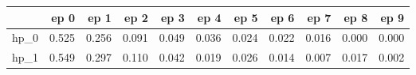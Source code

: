 \begin{tabular}{lrrrrrrrrrr}
\toprule
{} &   ep 0 &   ep 1 &   ep 2 &   ep 3 &   ep 4 &   ep 5 &   ep 6 &   ep 7 &   ep 8 &   ep 9 \\
\midrule
hp\_0 &  0.525 &  0.256 &  0.091 &  0.049 &  0.036 &  0.024 &  0.022 &  0.016 &  0.000 &  0.000 \\
hp\_1 &  0.549 &  0.297 &  0.110 &  0.042 &  0.019 &  0.026 &  0.014 &  0.007 &  0.017 &  0.002 \\
\bottomrule
\end{tabular}
